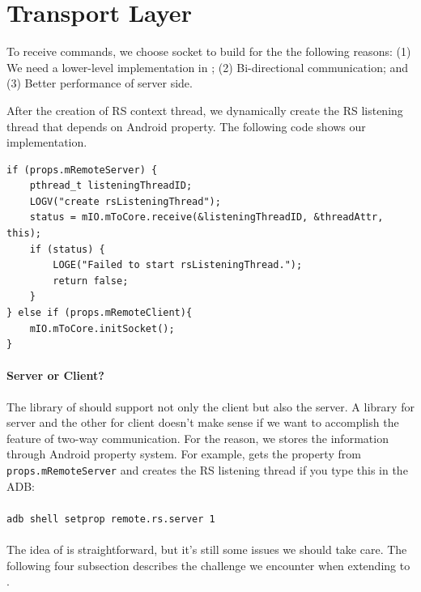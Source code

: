 \section{Transport Layer}
\label{s:rsListeningThread}
To receive commands, we choose socket to build \Transport{} for the the following reasons: (1) We need a lower-level implementation in \Core{}; (2) Bi-directional communication; and (3) Better performance of server side.

After the creation of RS context thread, we dynamically create the RS listening thread that depends on Android property. The following code shows our implementation.

\begin{lstlisting}
if (props.mRemoteServer) {
    pthread_t listeningThreadID;
    LOGV("create rsListeningThread");
    status = mIO.mToCore.receive(&listeningThreadID, &threadAttr, this);
    if (status) {
        LOGE("Failed to start rsListeningThread.");
        return false;
    }    
} else if (props.mRemoteClient){
    mIO.mToCore.initSocket();
} 
\end{lstlisting}

\paragraph{Server or Client?} The library of \RRS{} should support not only the client but also the server. A library for server and the other for client doesn't make sense if we want to accomplish the feature of two-way communication. For the reason, we stores the information through Android property system. For example, \RRS{} gets the property from \verb|props.mRemoteServer| and creates the RS listening thread if you type this in the ADB: 
\\\\ \verb|adb shell setprop remote.rs.server 1|\\\\

The idea of \RRS{} is straightforward, but it's still some issues we should take care. The following four subsection describes the challenge we encounter when extending \RS{} to \RRS{}.

